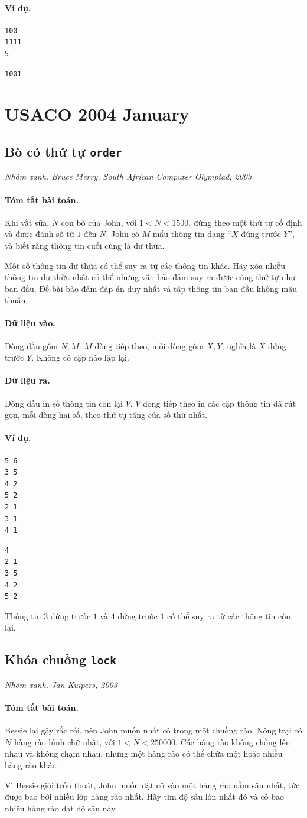 \documentclass[11pt]{article}
\newcommand{\problem}[4]{%
  \subsection[#1 (#2)]{#1 \hfill {\normalsize\texttt{#2}}}%
  \noindent\textit{#3. #4}\par\smallskip
}
\newcommand{\iosec}[1]{\paragraph{#1}}
\begin{document}
\iosec{Ví dụ.}
\begin{verbatim}
100
1111
5
\end{verbatim}

\begin{verbatim}
1001
\end{verbatim}

\section{USACO 2004 January}

\problem{Bò có thứ tự}{order}{Nhóm xanh}{Bruce Merry, South African Computer Olympiad, 2003}

\iosec{Tóm tắt bài toán.}
Khi vắt sữa, \(N\) con bò của John, với \(1<N<1500\), đứng theo một thứ tự cố
định và được đánh số từ \(1\) đến \(N\). John có \(M\) mẩu thông tin dạng
``\(X\) đứng trước \(Y\)'', và biết rằng thông tin cuối cùng là dư thừa.

Một số thông tin dư thừa có thể suy ra từ các thông tin khác. Hãy xóa nhiều
thông tin dư thừa nhất có thể nhưng vẫn bảo đảm suy ra được cùng thứ tự như
ban đầu. Đề bài bảo đảm đáp án duy nhất và tập thông tin ban đầu không mâu
thuẫn.

\iosec{Dữ liệu vào.}
Dòng đầu gồm \(N,M\). \(M\) dòng tiếp theo, mỗi dòng gồm \(X,Y\), nghĩa là
\(X\) đứng trước \(Y\). Không có cặp nào lặp lại.

\iosec{Dữ liệu ra.}
Dòng đầu in số thông tin còn lại \(V\). \(V\) dòng tiếp theo in các cặp thông
tin đã rút gọn, mỗi dòng hai số, theo thứ tự tăng của số thứ nhất.

\iosec{Ví dụ.}
\begin{verbatim}
5 6
3 5
4 2
5 2
2 1
3 1
4 1
\end{verbatim}

\begin{verbatim}
4
2 1
3 5
4 2
5 2
\end{verbatim}

Thông tin \(3\) đứng trước \(1\) và \(4\) đứng trước \(1\) có thể suy ra từ
các thông tin còn lại.

\problem{Khóa chuồng}{lock}{Nhóm xanh}{Jan Kuipers, 2003}

\iosec{Tóm tắt bài toán.}
Bessie lại gây rắc rối, nên John muốn nhốt cô trong một chuồng rào. Nông trại
có \(N\) hàng rào hình chữ nhật, với \(1<N<250000\). Các hàng rào không chồng
lên nhau và không chạm nhau, nhưng một hàng rào có thể chứa một hoặc nhiều
hàng rào khác.

Vì Bessie giỏi trốn thoát, John muốn đặt cô vào một hàng rào nằm sâu nhất,
tức được bao bởi nhiều lớp hàng rào nhất. Hãy tìm độ sâu lớn nhất đó và có bao
nhiêu hàng rào đạt độ sâu này.
\end{document}
